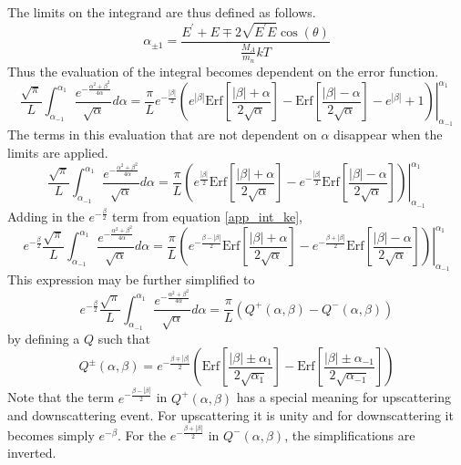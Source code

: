 The limits on the integrand are thus defined as follows.
\begin{equation}
\label{app_alpha_limits}
\alpha_{\pm 1} = \frac{E^\prime + E \mp 2\sqrt{E^\prime E}\cos(\theta)}{\frac{M_A}{m_n}kT}
\end{equation}
Thus the evaluation of the integral becomes dependent on the error function.
\begin{equation}
\label{app_int_ke_3}
\frac{\sqrt{\pi}}{L} \int_{\alpha_{-1}}^{\alpha_1} \frac{e^{-\frac{\alpha^2 + \beta^2}{4\alpha}}}{\sqrt{\alpha}} d\alpha = 
    \frac{\pi}{L} e^{-\frac{|\beta|}{2}} \left. \left(
    e^{|\beta|} \mbox{Erf}\left[\frac{|\beta| + \alpha}{2\sqrt{\alpha}}\right] - 
    \mbox{Erf}\left[\frac{|\beta| - \alpha}{2\sqrt{\alpha}}\right] - 
    e^{|\beta|} + 1
    \right) \right|_{\alpha_{-1}}^{\alpha_1}
\end{equation}
The terms in this evaluation that are not dependent on $\alpha$ disappear when the limits are applied.
\begin{equation}
\label{app_int_ke_4}
\frac{\sqrt{\pi}}{L} \int_{\alpha_{-1}}^{\alpha_1} \frac{e^{-\frac{\alpha^2 + \beta^2}{4\alpha}}}{\sqrt{\alpha}} d\alpha = 
    \frac{\pi}{L} \left. \left(
    e^{\frac{|\beta|}{2}}  \mbox{Erf}\left[\frac{|\beta| + \alpha}{2\sqrt{\alpha}}\right] - 
    e^{-\frac{|\beta|}{2}} \mbox{Erf}\left[\frac{|\beta| - \alpha}{2\sqrt{\alpha}}\right] 
    \right) \right|_{\alpha_{-1}}^{\alpha_1}
\end{equation}
Adding in the $e^{-\frac{\beta}{2}}$ term from equation \ref{app_int_ke}, 
\begin{equation}
\label{app_int_ke_5}
e^{-\frac{\beta}{2}} \frac{\sqrt{\pi}}{L} \int_{\alpha_{-1}}^{\alpha_1} \frac{e^{-\frac{\alpha^2 + \beta^2}{4\alpha}}}{\sqrt{\alpha}} d\alpha = 
    \frac{\pi}{L} \left. \left(
    e^{-\frac{\beta - |\beta|}{2}} \mbox{Erf}\left[\frac{|\beta| + \alpha}{2\sqrt{\alpha}}\right] - 
    e^{-\frac{\beta + |\beta|}{2}} \mbox{Erf}\left[\frac{|\beta| - \alpha}{2\sqrt{\alpha}}\right] 
    \right) \right|_{\alpha_{-1}}^{\alpha_1}
\end{equation}
This expression may be further simplified to 
\begin{equation}
\label{app_int_ke_6}
e^{-\frac{\beta}{2}} \frac{\sqrt{\pi}}{L} \int_{\alpha_{-1}}^{\alpha_1} \frac{e^{-\frac{\alpha^2 + \beta^2}{4\alpha}}}{\sqrt{\alpha}} d\alpha = 
    \frac{\pi}{L} \left(Q^+(\alpha, \beta) - Q^-(\alpha, \beta) \right) 
\end{equation}
by defining a $Q$ such that
\begin{equation}
\label{app_Q_pm}
Q^\pm(\alpha, \beta) = e^{-\frac{\beta \mp |\beta|}{2}} \left( 
    \mbox{Erf}\left[\frac{|\beta| \pm \alpha_1}{2\sqrt{\alpha_1}}\right] -
    \mbox{Erf}\left[\frac{|\beta| \pm \alpha_{-1}}{2\sqrt{\alpha_{-1}}}\right]  
    \right) 
\end{equation}
Note that the term $e^{-\frac{\beta - |\beta|}{2}}$ in $Q^+(\alpha, \beta)$ has a special meaning 
for upscattering and downscattering event.  For upscattering it is unity and for downscattering it 
becomes simply $e^{-\beta}$.  For the $e^{-\frac{\beta + |\beta|}{2}}$ in $Q^-(\alpha, \beta)$, 
the simplifications are inverted.

